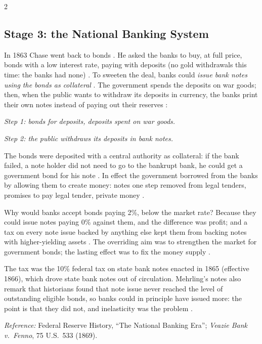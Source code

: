 \begin{paracol}{2}
\subsection{Stage 3: the National Banking System}\label{sec:st-nbsorigin}
In 1863 Chase went back to bonds . He asked the banks to buy, at full price, bonds with a low interest
rate, paying with deposits (no gold withdrawals this time: the banks had none) . To sweeten the deal,
banks could \emph{issue bank notes using the bonds as collateral} . The government spends the deposits
on war goods; then, when the public wants to withdraw its deposits in currency, the banks print their own notes instead of paying
out their reserves :
\begin{taccts}
\textit{Step 1: bonds for deposits, deposits spent on war goods.}\par
{}\quad
{}\quad
{}

\medskip
\textit{Step 2: the public withdraws its deposits in bank notes.}\par
{}\quad
{}
\end{taccts}
The bonds were deposited with a central authority as collateral: if the bank failed, a note holder did not need to go to the
bankrupt bank, he could get a government bond for his note . In effect the government borrowed from the
banks by allowing them to create money: notes one step removed from legal tenders, promises to pay legal tender, private money
.

Why would banks accept bonds paying 2\%, below the market rate? Because they could issue notes paying 0\% against them, and the difference was
profit; and a tax on every note issue backed by anything else kept them from backing notes with higher-yielding assets . The
overriding aim was to strengthen the market for government bonds; the lasting effect was to fix the money supply .

\begin{coursenote}
The tax was the 10\% federal tax on state bank notes enacted in 1865 (effective 1866), which drove state bank notes out of circulation. Mehrling's notes
also remark that historians found that note issue never reached the level of outstanding eligible bonds, so banks could in principle have issued
more: the point is that they did not, and inelasticity was the problem .\par
\emph{Reference:} Federal Reserve History, ``The National Banking Era''; \emph{Veazie Bank v.\ Fenno}, 75 U.S.\ 533 (1869).
\end{coursenote}


\end{paracol}

